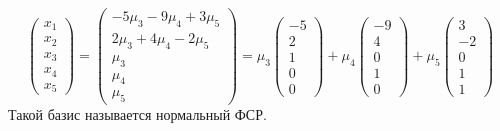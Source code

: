 \documentclass[a4paper, 12pt]{article}
\theoremstyle{definition}
\begin{document}
  $$\begin{pmatrix}
    x_1 \\ x_2 \\ \hline x_3 \\ x_4 \\ x_5
  \end{pmatrix} = \begin{pmatrix}
    -5\mu_3-9\mu_4+3\mu_5 \\ 2\mu_3 + 4\mu_4-2\mu_5 \\ \hline \mu_3 \\ \mu_4 \\ \mu_5
  \end{pmatrix} = \mu_3 \begin{pmatrix}
    -5 \\ 2 \\ \hline 1 \\ 0 \\ 0
  \end{pmatrix} + \mu_4 \begin{pmatrix}
    -9 \\ 4 \\ \hline 0 \\ 1 \\ 0
  \end{pmatrix} + \mu_5 \begin{pmatrix}
    3 \\ -2 \\ \hline 0 \\ 1 \\ 1 
  \end{pmatrix}$$ 
  Такой базис называется нормальный ФСР. 
\end{document}
